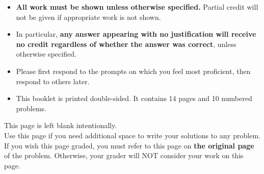 \documentclass[11pt]{article}
\begin{document}
{\begin{itemize}
    \item \textbf{All work must be shown unless otherwise specified.} Partial credit will not be given if appropriate work is not shown.
    \item In particular, {\bf any answer appearing with no justification will receive no credit regardless of whether the answer was correct}, unless otherwise specified.
    \item Please first respond to the prompts on which you feel most proficient, then respond to others later.
    \item This booklet is printed double-sided. It contains 14 pages and 10 numbered problems.
    \end{itemize}
    
    }

\vfill


\newpage

This page is left blank intentionally.\\

Use this page if you need additional space to write your solutions to any problem. \\

If you wish this page graded, you must refer to this page on \textbf{the original page} of the problem. Otherwise, your grader will NOT consider your work on this page.

\newpage%
\end{document}
